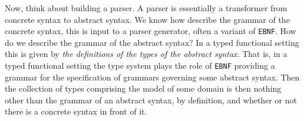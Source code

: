 Now, think about building a parser. A parser is essentially a
transformer from concrete syntax to abstract syntax. We know how
describe the grammar of the concrete syntax, this is input to a parser
generator, often a variant of \texttt{EBNF}. How do we describe the
grammar of the abstract syntax? In a typed functional setting this is
given by \emph{the definitions of the types of the abstract
  syntax}. That is, in a typed functional setting the type system
plays the role of \texttt{EBNF} providing a grammar for the
specification of grammars governing some abstract syntax. Then the
collection of types comprising the model of some domain is then
nothing other than the grammar of an abstract syntax, by definition,
and whether or not there is a concrete syntax in front of it. 

